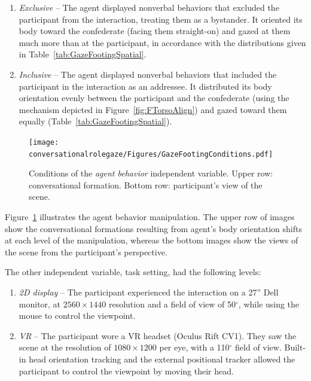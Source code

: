\begin{enumerate}
\item \emph{Exclusive} -- The agent displayed nonverbal behaviors that excluded the participant from the interaction, treating them as a bystander. It oriented its body toward the confederate (facing them straight-on) and gazed at them much more than at the participant, in accordance with the distributions given in Table~\ref{tab:GazeFootingSpatial}.
\item \emph{Inclusive} -- The agent displayed nonverbal behaviors that included the participant in the interaction as an addressee. It distributed its body orientation evenly between the participant and the confederate (using the mechanism depicted in Figure~\ref{fig:FTorsoAlign}) and gazed toward them equally (Table~\ref{tab:GazeFootingSpatial}).
\end{enumerate}

\begin{figure}
\centering
\texttt{[image: conversationalrolegaze/Figures/GazeFootingConditions.pdf]}
\caption{Conditions of the \emph{agent behavior} independent variable. Upper row: conversational formation. Bottom row: participant's view of the scene.}
\label{fig:GazeFootingConditions}
\end{figure}

Figure~\ref{fig:GazeFootingConditions} illustrates the agent behavior manipulation. The upper row of images show the conversational formations resulting from agent's body orientation shifts at each level of the manipulation, whereas the bottom images show the views of the scene from the participant's perspective.

The other independent variable, task setting, had the following levels:

\begin{enumerate}
\item \emph{2D display} -- The participant experienced the interaction on a 27'' Dell monitor, at $2560 \times 1440$ resolution and a field of view of 50$^\circ$, while using the mouse to control the viewpoint.
\item \emph{VR} -- The participant wore a VR headset (Oculus Rift CV1). They saw the scene at the resolution of $1080 \times 1200$ per eye, with a 110$^\circ$ field of view. Built-in head orientation tracking and the external positional tracker allowed the participant to control the viewpoint by moving their head.
\end{enumerate}


